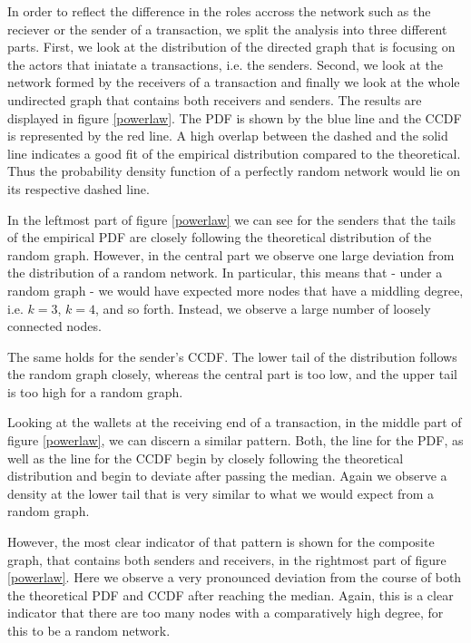 In order to reflect the difference in the roles accross the network such as the reciever or the sender of a transaction, we split the analysis into three different parts. First, we look at the distribution of the directed graph that is focusing on the actors that iniatate a transactions, i.e. the senders. Second, we look at the network formed by the receivers of a transaction and finally we look at the whole undirected graph that contains both receivers and senders. The results are displayed in figure \ref{powerlaw}. The PDF is shown by the blue line and the CCDF is represented by the red line. A high overlap between the dashed and the solid line indicates a good fit of the empirical distribution compared to the theoretical. Thus the probability density function of a perfectly random network would lie on its respective dashed line.

In the leftmost part of figure \ref{powerlaw} we can see for the senders that the tails of the empirical PDF are closely following the theoretical distribution of the random graph. However, in the central part we observe one large deviation from the distribution of a random network. In particular, this means that - under a random graph - we would have expected more nodes that have a middling degree, i.e. $k=3$, $k=4$, and so forth. Instead, we observe a large number of loosely connected nodes.

The same holds for the sender's CCDF. The lower tail of the distribution follows the random graph closely, whereas the central part is too low, and the upper tail is too high for a random graph.

Looking at the wallets at the receiving end of a transaction, in the middle part of figure \ref{powerlaw}, we can discern a similar pattern. Both, the line for the PDF, as well as the line for the CCDF begin by closely following the theoretical distribution and begin to deviate after passing the median. Again we observe a density at the lower tail that is very similar to what we would expect from a random graph.

However, the most clear indicator of that pattern is shown for the composite graph, that contains both senders and receivers, in the rightmost part of figure \ref{powerlaw}. Here we observe a very pronounced deviation from the course of both the theoretical PDF and CCDF after reaching the median. Again, this is a clear indicator that there are too many nodes with a comparatively high degree, for this to be a random network.

